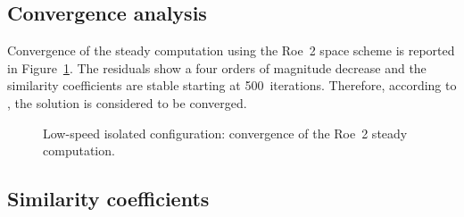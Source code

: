 
\subsection{Convergence analysis}
\label{sub:dream_ls_conv_coeff}

Convergence of the steady computation using the Roe~2 space scheme
is reported in Figure~\ref{fig:dream_ls_convergence_roe2}. The residuals
show a four orders of magnitude decrease and the similarity
coefficients are stable starting at 500~iterations.
Therefore, according to \citet{Casey2000}, the
solution is considered to be converged.
\begin{figure}[htp]
  \centering
  \caption{Low-speed isolated configuration: convergence of the Roe~2 steady
  computation.}
  \label{fig:dream_ls_convergence_roe2}
\end{figure}

\subsection{Similarity coefficients}
\label{sub:dream_ls_sim_coeff}

